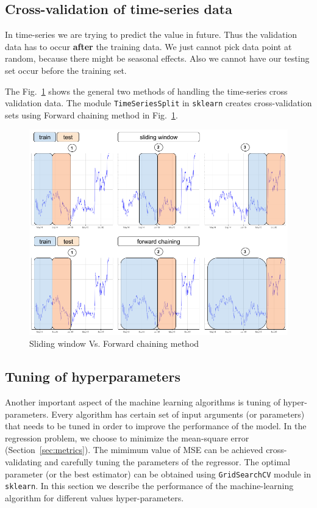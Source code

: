 \documentclass[12pt]{article}
\begin{document}
\begin{itemize}
\subsection{Cross-validation of time-series data}
\label{sec:crossval}
In time-series we are trying to predict the value in future. Thus the validation data has to occur \textbf{after} the training data. We just cannot pick data point at random, because there might be seasonal effects. Also we cannot have our testing set occur before the training set.

The Fig.~\ref{fig:ts_xval} shows the general two methods of handling the time-series cross validation data. The module \texttt{TimeSeriesSplit} in \texttt{sklearn} creates cross-validation sets using Forward chaining method in Fig.~\ref{fig:ts_xval}.

\begin{figure}[!htbp]
\begin{center}
\includegraphics[height=0.4\textheight,width=\textwidth]{ts_xval.png}
\caption{Sliding window Vs. Forward chaining method}
\label{fig:ts_xval}
\end{center}
\end{figure}

\subsection{Tuning of hyperparameters}
\label{sec:hyper}
Another important aspect of the machine learning algorithms is tuning of hyper-parameters. Every algorithm has certain set of input arguments (or parameters) that needs to be tuned in order to improve the performance of the model. In the regression problem, we choose to minimize the mean-square error (Section~\ref{sec:metrics}). The mimimum value of MSE can be achieved cross-validating and carefully tuning the parameters of the regressor. The optimal parameter (or the best estimator) can be obtained using \texttt{GridSearchCV} \cite{grid} module in \texttt{sklearn}. In this section we describe the performance of the machine-learning algorithm for different values hyper-parameters.


\end{itemize}
\end{document}
